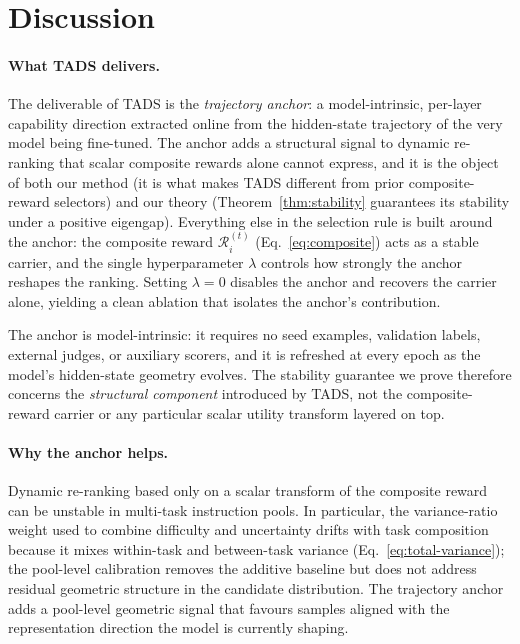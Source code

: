 \section{Discussion}
\label{sec:discussion}

\paragraph{What TADS delivers.}
The deliverable of \textsc{TADS} is the \emph{trajectory anchor}:
a model-intrinsic, per-layer capability direction extracted online
from the hidden-state trajectory of the very model being
fine-tuned. The anchor adds a structural signal to dynamic
re-ranking that scalar composite rewards alone cannot express, and
it is the object of both our method (it is what makes
\textsc{TADS} different from prior composite-reward selectors) and
our theory (Theorem~\ref{thm:stability} guarantees its stability
under a positive eigengap). Everything else in the selection rule
is built around the anchor: the composite reward
$\mathcal{R}_i^{(t)}$ (Eq.~\ref{eq:composite}) acts as a
stable carrier, and the single hyperparameter $\lambda$ controls
how strongly the anchor reshapes the ranking. Setting $\lambda=0$
disables the anchor and recovers the carrier alone, yielding a
clean ablation that isolates the anchor's contribution.

The anchor is model-intrinsic: it requires no seed examples,
validation labels, external judges, or auxiliary scorers, and it
is refreshed at every epoch as the model's hidden-state geometry
evolves. The stability guarantee we prove therefore concerns the
\emph{structural component} introduced by \textsc{TADS}, not the
composite-reward carrier or any particular scalar utility
transform layered on top.

\paragraph{Why the anchor helps.}
Dynamic re-ranking based only on a scalar transform of the
composite reward can be unstable in multi-task instruction pools.
In particular, the variance-ratio weight used to combine difficulty
and uncertainty drifts with task composition because it mixes
within-task and between-task variance
(Eq.~\ref{eq:total-variance}); the pool-level calibration removes
the additive baseline but does not address residual geometric
structure in the candidate distribution. The trajectory anchor adds
a pool-level geometric signal that favours samples aligned with the
representation direction the model is currently shaping.

